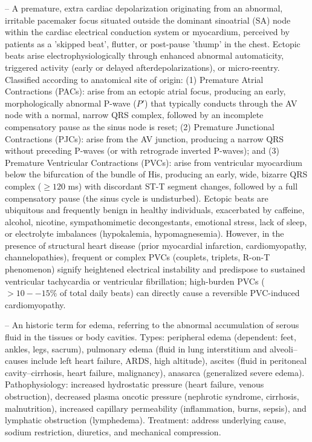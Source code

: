 -- A premature, extra cardiac depolarization originating from an abnormal, irritable pacemaker focus situated outside the dominant sinoatrial (SA) node within the cardiac electrical conduction system or myocardium, perceived by patients as a 'skipped beat', flutter, or post-pause 'thump' in the chest. Ectopic beats arise electrophysiologically through enhanced abnormal automaticity, triggered activity (early or delayed afterdepolarizations), or micro-reentry. Classified according to anatomical site of origin: (1) Premature Atrial Contractions (PACs): arise from an ectopic atrial focus, producing an early, morphologically abnormal P-wave ($P'$) that typically conducts through the AV node with a normal, narrow QRS complex, followed by an incomplete compensatory pause as the sinus node is reset; (2) Premature Junctional Contractions (PJCs): arise from the AV junction, producing a narrow QRS without preceding P-waves (or with retrograde inverted P-waves); and (3) Premature Ventricular Contractions (PVCs): arise from ventricular myocardium below the bifurcation of the bundle of His, producing an early, wide, bizarre QRS complex ($\ge 120$ ms) with discordant ST-T segment changes, followed by a full compensatory pause (the sinus cycle is undisturbed). Ectopic beats are ubiquitous and frequently benign in healthy individuals, exacerbated by caffeine, alcohol, nicotine, sympathomimetic decongestants, emotional stress, lack of sleep, or electrolyte imbalances (hypokalemia, hypomagnesemia). However, in the presence of structural heart disease (prior myocardial infarction, cardiomyopathy, channelopathies), frequent or complex PVCs (couplets, triplets, R-on-T phenomenon) signify heightened electrical instability and predispose to sustained ventricular tachycardia or ventricular fibrillation; high-burden PVCs ($>10--15\%$ of total daily beats) can directly cause a reversible PVC-induced cardiomyopathy.

-- An historic term for edema, referring to the abnormal accumulation of serous fluid in the tissues or body cavities. Types: peripheral edema (dependent: feet, ankles, legs, sacrum), pulmonary edema (fluid in lung interstitium and alveoli--causes include left heart failure, ARDS, high altitude), ascites (fluid in peritoneal cavity--cirrhosis, heart failure, malignancy), anasarca (generalized severe edema). Pathophysiology: increased hydrostatic pressure (heart failure, venous obstruction), decreased plasma oncotic pressure (nephrotic syndrome, cirrhosis, malnutrition), increased capillary permeability (inflammation, burns, sepsis), and lymphatic obstruction (lymphedema). Treatment: address underlying cause, sodium restriction, diuretics, and mechanical compression.


